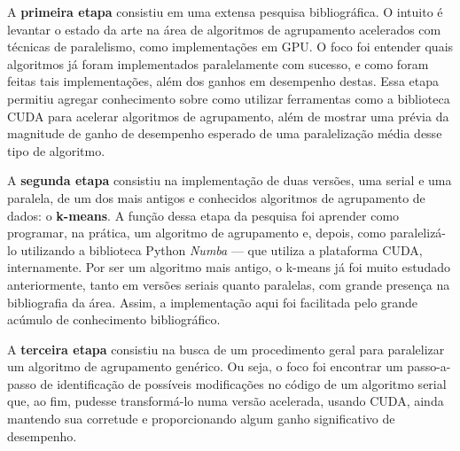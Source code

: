 \documentclass[12pt,
openright, 
oneside, %
a4paper,    %
brazil]{facom-ufu-abntex2}
\begin{document}
A \textbf{primeira etapa} consistiu em uma extensa pesquisa bibliográfica. O intuito é levantar o estado da arte na área de algoritmos de agrupamento acelerados com técnicas de paralelismo, como implementações em GPU. O foco foi entender quais algoritmos já foram implementados paralelamente com sucesso, e como foram feitas tais implementações, além dos ganhos em desempenho destas. Essa etapa permitiu agregar conhecimento sobre como utilizar ferramentas como a biblioteca CUDA para acelerar algoritmos de agrupamento, além de mostrar uma prévia da magnitude de ganho de desempenho esperado de uma paralelização média desse tipo de algoritmo.

A \textbf{segunda etapa} consistiu na implementação de duas versões, uma serial e uma paralela, de um dos mais antigos e conhecidos algoritmos de agrupamento de dados: o \textbf{k-means}. A função dessa etapa da pesquisa foi aprender como programar, na prática, um algoritmo de agrupamento e, depois, como paralelizá-lo utilizando a biblioteca Python \textit{Numba} --- que utiliza a plataforma CUDA, internamente. Por ser um algoritmo mais antigo, o k-means já foi muito estudado anteriormente, tanto em versões seriais quanto paralelas, com grande presença na bibliografia da área. Assim, a implementação aqui foi facilitada pelo grande acúmulo de conhecimento bibliográfico. %


A \textbf{terceira etapa} consistiu na busca de um procedimento geral para paralelizar um algoritmo de agrupamento genérico. Ou seja, o foco foi encontrar um passo-a-passo de identificação de possíveis modificações no código de um algoritmo serial que, ao fim, pudesse transformá-lo numa versão acelerada, usando CUDA, ainda mantendo sua corretude e proporcionando algum ganho significativo de desempenho.
\end{document}
